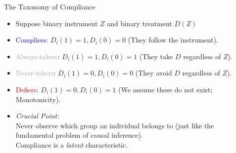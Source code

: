 \documentclass[11pt, handout]{beamer}
\begin{document}
\begin{frame}{The Taxonomy of Compliance}
    \begin{itemize}[<+->]
        \item Suppose binary instrument $Z$ and binary treatment $D(Z)$
        \vspace{0.8em}
        \item \textcolor{blue}{Compliers}: $D_i(1)=1, D_i(0)=0$ (They follow the instrument).
        \vspace{0.8em}
        \item \textcolor{darkgray}{Always-takers}: $D_i(1)=1, D_i(0)=1$ (They take $D$ regardless of $Z$).
        \vspace{0.8em}
        \item \textcolor{darkgray}{Never-takers}: $D_i(1)=0, D_i(0)=0$ (They avoid $D$ regardless of $Z$).
        \vspace{0.8em}
        \item \textcolor{red}{Defiers}: $D_i(1)=0, D_i(0)=1$ (We assume these do not exist; Monotonicity).
        \vspace{0.8em}
        \item \textit{Crucial Point:} \\ Never observe which group an individual belongs to (just like the fundamental problem of causal inference). \\ Compliance is a \textit{latent} characteristic.
    \end{itemize}
\end{frame}
\end{document}
